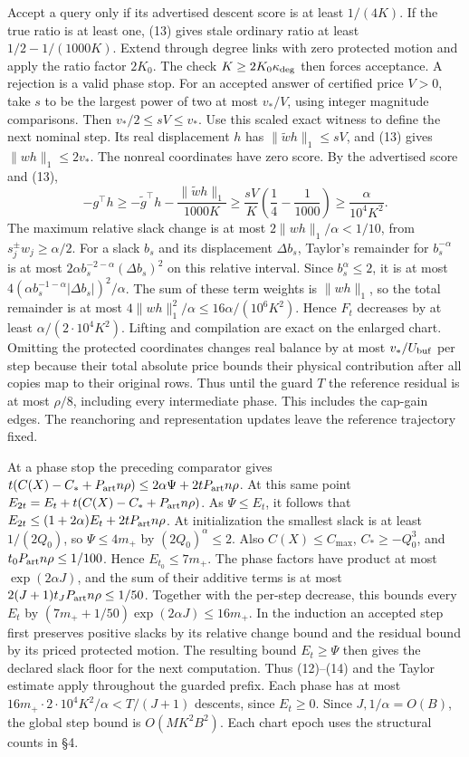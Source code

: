 \documentclass[11pt]{article}
\begin{document}
Accept a query only if its advertised descent score is at least \(1/(4K)\). If the true ratio is at least one, (13) gives stale ordinary ratio at least \(1/2-1/(1000K)\). Extend through degree links with zero protected motion and apply the ratio factor \(2K_0\). The check \(K\ge2K_0\kappa_{\rm deg}\) then forces acceptance. A rejection is a valid phase stop. For an accepted answer of certified price \(V>0\), take \(s\) to be the largest power of two at most \(v_\ast/V\), using integer magnitude comparisons. Then \(v_\ast/2\le sV\le v_\ast\). Use this scaled exact witness to define the next nominal step. Its real displacement \(h\) has \(\|\widetilde w h\|_1\le sV\), and (13) gives \(\|wh\|_1\le2v_\ast\). The nonreal coordinates have zero score. By the advertised score and (13),
\[
 -g^\top h\ge -\widetilde g^\top h-\frac{\|\widetilde w h\|_1}{1000K}
 \ge \frac{sV}{K}\left(\frac14-\frac1{1000}\right)
 \ge \frac{\alpha}{10^4 K^2}.
\]
The maximum relative slack change is at most \(2\|wh\|_1/\alpha<1/10\), from \(s_j^\pm w_j\ge\alpha/2\). For a slack \(b_s\) and its displacement \(\Delta b_s\), Taylor's remainder for \(b_s^{-\alpha}\) is at most \(2\alpha b_s^{-2-\alpha}(\Delta b_s)^2\) on this relative interval. Since \(b_s^\alpha\le2\), it is at most \(4(\alpha b_s^{-1-\alpha}|\Delta b_s|)^2/\alpha\). The sum of these term weights is \(\|wh\|_1\), so the total remainder is at most \(4\|wh\|_1^2/\alpha\le 16\alpha/(10^6K^2)\). Hence \(F_t\) decreases by at least \(\alpha/(2\cdot10^4 K^2)\). Lifting and compilation are exact on the enlarged chart. Omitting the protected coordinates changes real balance by at most \(v_\ast/U_{\rm buf}\) per step because their total absolute price bounds their physical contribution after all copies map to their original rows. Thus until the guard \(T\) the reference residual is at most \(\rho/8\), including every intermediate phase. This includes the cap-gain edges. The reanchoring and representation updates leave the reference trajectory fixed.

At a phase stop the preceding comparator gives \(t(C(X)-C_*+P_{\rm art}n\rho)\le2\alpha\Psi+2tP_{\rm art}n\rho\). At this same point \(E_{2t}=E_t+t(C(X)-C_*+P_{\rm art}n\rho)\). As \(\Psi\le E_t\), it follows that \(E_{2t}\le(1+2\alpha)E_t+2tP_{\rm art}n\rho\). At initialization the smallest slack is at least \(1/(2Q_0)\), so \(\Psi\le4m_+\) by \((2Q_0)^\alpha\le2\). Also \(C(X)\le C_{\max}\), \(C_*\ge-Q_0^3\), and \(t_0P_{\rm art}n\rho\le1/100\). Hence \(E_{t_0}\le7m_+\). The phase factors have product at most \(\exp(2\alpha J)\), and the sum of their additive terms is at most \(2(J+1)t_JP_{\rm art}n\rho\le1/50\). Together with the per-step decrease, this bounds every \(E_t\) by \((7m_++1/50)\exp(2\alpha J)\le16m_+\). In the induction an accepted step first preserves positive slacks by its relative change bound and the residual bound by its priced protected motion. The resulting bound \(E_t\ge\Psi\) then gives the declared slack floor for the next computation. Thus (12)--(14) and the Taylor estimate apply throughout the guarded prefix. Each phase has at most \(16m_+\cdot 2\cdot10^4 K^2/\alpha<T/(J+1)\) descents, since \(E_t\ge0\). Since \(J,1/\alpha=O(B)\), the global step bound is \(O(MK^2 B^2)\). Each chart epoch uses the structural counts in §4.
\end{document}
